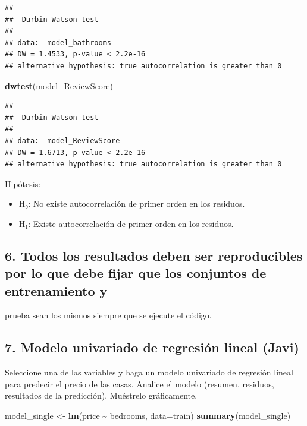 \documentclass[
]{article}
\newenvironment{Shaded}{\begin{snugshade}}{\end{snugshade}}
\newcommand{\AttributeTok}[1]{\textcolor[rgb]{0.13,0.29,0.53}{#1}}
\newcommand{\FunctionTok}[1]{\textcolor[rgb]{0.13,0.29,0.53}{\textbf{#1}}}
\newcommand{\NormalTok}[1]{#1}
\newcommand{\OtherTok}[1]{\textcolor[rgb]{0.56,0.35,0.01}{#1}}
\newcommand{\SpecialCharTok}[1]{\textcolor[rgb]{0.81,0.36,0.00}{\textbf{#1}}}
\providecommand{\tightlist}{%
  \setlength{\itemsep}{0pt}\setlength{\parskip}{0pt}}
\begin{document}
\begin{verbatim}
## 
##  Durbin-Watson test
## 
## data:  model_bathrooms
## DW = 1.4533, p-value < 2.2e-16
## alternative hypothesis: true autocorrelation is greater than 0
\end{verbatim}

\begin{Shaded}
\begin{Highlighting}[]
\FunctionTok{dwtest}\NormalTok{(model\_ReviewScore)}
\end{Highlighting}
\end{Shaded}

\begin{verbatim}
## 
##  Durbin-Watson test
## 
## data:  model_ReviewScore
## DW = 1.6713, p-value < 2.2e-16
## alternative hypothesis: true autocorrelation is greater than 0
\end{verbatim}

Hipótesis:

\begin{itemize}
\tightlist
\item
  H₀: No existe autocorrelación de primer orden en los residuos.
\item
  H₁: Existe autocorrelación de primer orden en los residuos.
\end{itemize}

\subsection{6. Todos los resultados deben ser reproducibles por lo que
debe fijar que los conjuntos de entrenamiento
y}\label{todos-los-resultados-deben-ser-reproducibles-por-lo-que-debe-fijar-que-los-conjuntos-de-entrenamiento-y}

prueba sean los mismos siempre que se ejecute el código.

\subsection{7. Modelo univariado de regresión lineal
(Javi)}\label{modelo-univariado-de-regresiuxf3n-lineal-javi}

Seleccione una de las variables y haga un modelo univariado de regresión
lineal para predecir el precio de las casas. Analice el modelo (resumen,
residuos, resultados de la predicción). Muéstrelo gráficamente.

\begin{Shaded}
\begin{Highlighting}[]
\NormalTok{model\_single }\OtherTok{\textless{}{-}} \FunctionTok{lm}\NormalTok{(price }\SpecialCharTok{\textasciitilde{}}\NormalTok{ bedrooms, }\AttributeTok{data=}\NormalTok{train)}
\FunctionTok{summary}\NormalTok{(model\_single)}
\end{Highlighting}
\end{Shaded}
\end{document}
